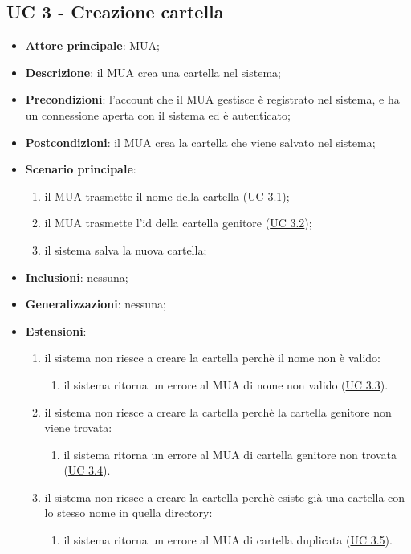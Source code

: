 \subsection{UC 3 - Creazione cartella} \label{sec:UC3}
    \begin{itemize}
        \item \textbf{Attore principale}: MUA;
        \item \textbf{Descrizione}: il MUA crea una cartella nel sistema;
        \item \textbf{Precondizioni}: l’account che il MUA gestisce è registrato nel sistema, e ha un connessione aperta con il sistema ed è autenticato;
        \item \textbf{Postcondizioni}: il MUA crea la cartella che viene salvato nel sistema;
        \item \textbf{Scenario principale}:
            \begin{enumerate}
                \item il MUA trasmette il nome della cartella (\hyperref[sec:UC3.1]{UC 3.1});
                \item il MUA trasmette l'id della cartella genitore (\hyperref[sec:UC3.2]{UC 3.2});
                \item il sistema salva la nuova cartella;
            \end{enumerate}
        \item \textbf{Inclusioni}: nessuna;
        \item \textbf{Generalizzazioni}: nessuna;
        \item \textbf{Estensioni}: 
        \begin{enumerate}[label=\alph*.]
            \item il sistema non riesce a creare la cartella perchè il nome non è valido:
            \begin{enumerate}[label=\arabic*.]
                \item il sistema ritorna un errore al MUA di nome non valido (\hyperref[sec:UC3.3]{UC 3.3}).
            \end{enumerate}
            \item il sistema non riesce a creare la cartella perchè la cartella genitore non viene trovata:
            \begin{enumerate}[label=\arabic*.]
                \item il sistema ritorna un errore al MUA di cartella genitore non trovata (\hyperref[sec:UC3.4]{UC 3.4}).
            \end{enumerate}
            \item il sistema non riesce a creare la cartella perchè esiste già una cartella con lo stesso nome in quella directory:
            \begin{enumerate}[label=\arabic*.]
                \item il sistema ritorna un errore al MUA di cartella duplicata (\hyperref[sec:UC3.5]{UC 3.5}).
            \end{enumerate}
        \end{enumerate}
    \end{itemize}

